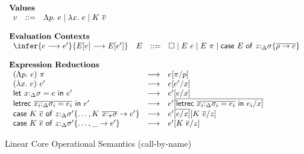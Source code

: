 
\begin{figure}[ht]
\begin{framed}
\small
\[
\begin{array}{l}
%
\textbf{Values} \\
\begin{array}{lcl}
    v & ::= & \Lambda p.~e \mid \lambda x.~e \mid K~\overline{v} \\
\end{array}\\\\
%
\textbf{Evaluation Contexts}\\
\begin{array}{llcl}
\infer{e \longrightarrow e'}{E[e] \longrightarrow E[e']} & E & ::= & \square \mid E~e \mid E~\pi \mid \ccase{E}{z{:}_{\Delta}\sigma \{\overline{\rho \to e}\}} \\
\end{array}\\\\
%
\textbf{Expression Reductions}\\
\begin{array}{lcl}
(\Lambda p.~e)~\pi & \longrightarrow & e[\pi/p]\\
%
(\lambda x.~e)~e' & \longrightarrow & e[e'/x]\\
%
\llet{x{:}_\Delta\sigma = e}{e'} & \longrightarrow & e'[e/x]\\
%
\lletrec{\overline{x_i{:}_\Delta\sigma_i = e_i}}{e'} & \longrightarrow &
    e'\overline{[\lletrec{\overline{x_i{:}_\Delta\sigma_i = e_i}}{e_i}/x]}\\
%
\ccase{K~\overline{e}}{z{:}_{\Delta}\sigma' \{\dots, K~\overline{x{:}_\pi\sigma} \to e'\}} &
\longrightarrow & e'\overline{[e/x]}[K~\overline{e}/z]\\
%
\ccase{K~\overline{e}}{z{:}_{\Delta}\sigma' \{\dots, \_ \to e'\}} & \longrightarrow & e'[K~\ov{e}/z]\\
\end{array}
\end{array}
\]
\end{framed}
\caption{Linear Core Operational Semantics \small(call-by-name)}
\label{fig:linear-core-operational-semantics}
\end{figure}

